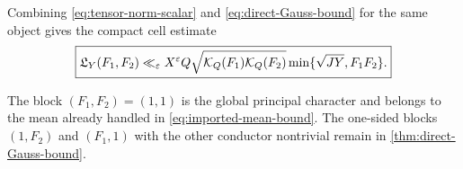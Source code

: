 Combining \eqref{eq:tensor-norm-scalar} and
\eqref{eq:direct-Gauss-bound} for the same object gives the compact
cell estimate
\begin{equation}
 \boxed{
 \mathfrak L_Y(F_1,F_2)
 \ll_\varepsilon X^\varepsilon Q
 \sqrt{\mathcal K_Q(F_1)\mathcal K_Q(F_2)}
 \min\{\sqrt{JY},F_1F_2\}.}
 \label{eq:combined-cell-bound}
\end{equation}

The block \((F_1,F_2)=(1,1)\) is the global principal character and
belongs to the mean already handled in \eqref{eq:imported-mean-bound}.
The one-sided blocks \((1,F_2)\) and \((F_1,1)\) with the other
conductor nontrivial remain in \cref{thm:direct-Gauss-bound}.
